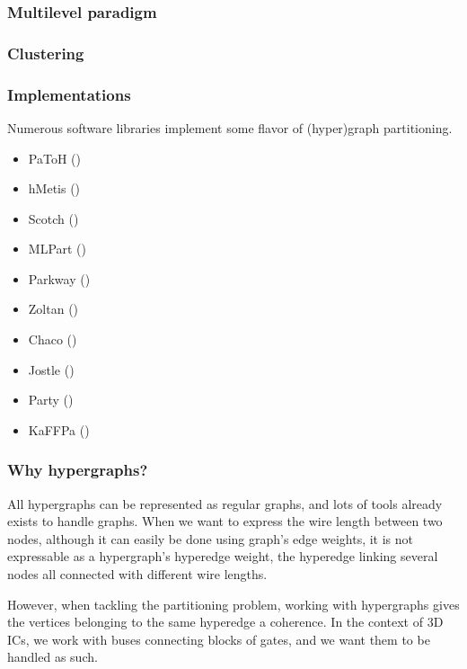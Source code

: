 \documentclass[11pt,a4paper]{article}
\theoremstyle{customdef}
\begin{document}
\subsubsection{Multilevel paradigm}
\subsubsection{Clustering}
\subsubsection{Implementations}
Numerous software libraries implement some flavor of (hyper)graph partitioning.
\begin{itemize}
	\item PaToH (\citet{Aykanat2011})
	\item hMetis (\citet{Karypis1999})
	\item Scotch (\citet{Aykanat2011})
	\item MLPart (\citet{Caldwell2000})
	\item Parkway (\citet{Trifunovic2008})
	\item Zoltan (\citet{Devine2006})
	\item Chaco (\citet{Lotfifar2015})
	\item Jostle (\citet{Walshaw1998})
	\item Party (\citet{Preis97party})
	\item KaFFPa (\citet{Holtgrewe2010})
\end{itemize}
\subsubsection{Why hypergraphs?}
All hypergraphs can be represented as regular graphs, and lots of tools already exists to handle graphs.
When we want to express the wire length between two nodes, although it can easily be done using graph's edge weights, it is not expressable as a hypergraph's hyperedge weight, the hyperedge linking several nodes all connected with different wire lengths.

However, when tackling the partitioning problem, working with hypergraphs gives the vertices belonging to the same hyperedge a coherence.
In the context of 3D ICs, we work with buses connecting blocks of gates, and we want them to be handled as such.
\end{document}
